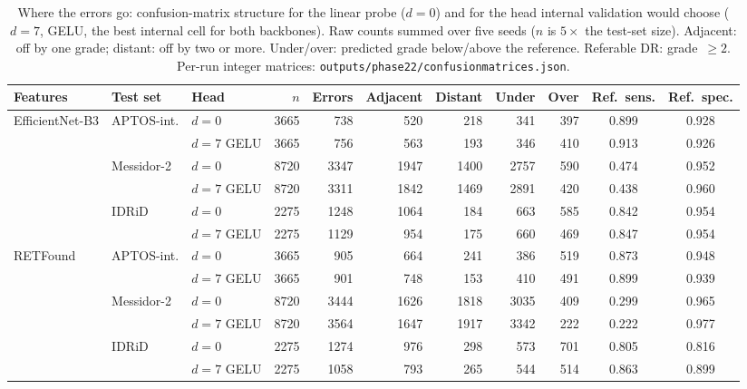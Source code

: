 \documentclass[journal]{IEEEtran}
\renewcommand{\_}{\origunderscore\allowbreak}
\begin{document}
\begin{table}[!t]
\centering\footnotesize
\caption{Where the errors go: confusion-matrix structure for the linear probe
($d=0$) and for the head internal validation would choose ($d=7$, GELU, the best
internal cell for both backbones). Raw counts summed over five seeds ($n$ is
$5\times$ the test-set size). Adjacent: off by one grade; distant: off by two or
more. Under/over: predicted grade below/above the reference. Referable DR:
grade~$\geq 2$. Per-run integer matrices: \texttt{outputs/\allowbreak{}phase22/\allowbreak{}confusion\_matrices.json}.}
\label{tab:headcm}
\setlength{\tabcolsep}{4pt}
\begin{tabular}{lllrrrrrrcc}
\toprule
Features & Test set & Head & $n$ & Errors & Adjacent & Distant & Under & Over & Ref.\ sens. & Ref.\ spec. \\
\midrule
EfficientNet-B3 & APTOS-int. & $d=0$ & 3665 & 738 & 520 & 218 & 341 & 397 & 0.899 & 0.928 \\
 & & $d=7$ GELU & 3665 & 756 & 563 & 193 & 346 & 410 & 0.913 & 0.926 \\
 & Messidor-2 & $d=0$ & 8720 & 3347 & 1947 & 1400 & 2757 & 590 & 0.474 & 0.952 \\
 & & $d=7$ GELU & 8720 & 3311 & 1842 & 1469 & 2891 & 420 & 0.438 & 0.960 \\
 & IDRiD & $d=0$ & 2275 & 1248 & 1064 & 184 & 663 & 585 & 0.842 & 0.954 \\
 & & $d=7$ GELU & 2275 & 1129 & 954 & 175 & 660 & 469 & 0.847 & 0.954 \\
\midrule
RETFound & APTOS-int. & $d=0$ & 3665 & 905 & 664 & 241 & 386 & 519 & 0.873 & 0.948 \\
 & & $d=7$ GELU & 3665 & 901 & 748 & 153 & 410 & 491 & 0.899 & 0.939 \\
 & Messidor-2 & $d=0$ & 8720 & 3444 & 1626 & 1818 & 3035 & 409 & 0.299 & 0.965 \\
 & & $d=7$ GELU & 8720 & 3564 & 1647 & 1917 & 3342 & 222 & 0.222 & 0.977 \\
 & IDRiD & $d=0$ & 2275 & 1274 & 976 & 298 & 573 & 701 & 0.805 & 0.816 \\
 & & $d=7$ GELU & 2275 & 1058 & 793 & 265 & 544 & 514 & 0.863 & 0.899 \\
\bottomrule
\end{tabular}
\end{table}
\end{document}
